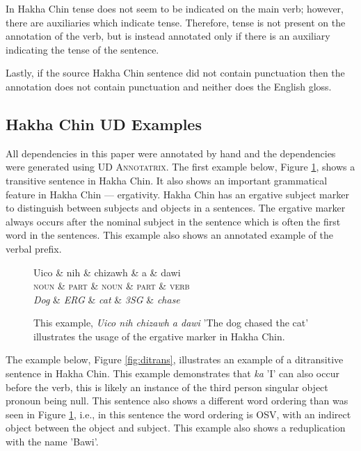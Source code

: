 \documentclass[10pt, a4paper]{article}
\begin{document}
In Hakha Chin tense does not seem to be indicated on the main verb; however, there are auxiliaries which indicate tense. Therefore, tense is not present on the annotation of the verb, but is instead annotated only if there is an auxiliary indicating the tense of the sentence.

Lastly, if the source Hakha Chin sentence did not contain punctuation then the annotation does not contain punctuation and neither does the English gloss. 

\subsection{Hakha Chin UD Examples}
\label{sec:actualdep}

All dependencies in this paper were annotated by hand and the dependencies were generated using UD \textsc{Annotatrix}. The first example below, Figure \ref{fig:erg}, shows a transitive sentence in Hakha Chin. It also shows an important grammatical feature in Hakha Chin --- ergativity. Hakha Chin has an ergative subject marker to distinguish between subjects and objects in a sentences. The ergative marker always occurs after the nominal subject in the sentence which is often the first word in the sentences. This example also shows an annotated example of the verbal prefix. 

\begin{figure}[h]
\centering
 \begin{dependency} 
   \begin{deptext}[column sep=0.2cm]
     Uico \& nih \& chizawh \& a \& dawi\\
     \textsc{noun} \& \textsc{part} \& \textsc{noun} \& \textsc{part} \& \textsc{verb}\\
     \emph{Dog} \& \emph{ERG} \& \emph{cat} \& \emph{3SG} \& 		\emph{chase} \\
     \end{deptext}
 \end{dependency}
\caption{\label{fig:erg}}This example, \emph{Uico nih chizawh a dawi} 'The dog chased the cat' illustrates the usage of the ergative marker in Hakha Chin.
\end{figure}

The example below, Figure \ref{fig:ditrans}, illustrates an example of a ditransitive sentence in Hakha Chin. This example demonstrates that \emph{ka} 'I' can also occur before the verb, this is likely an instance of the third person singular object pronoun being null. This sentence also shows a different word ordering than was seen in Figure \ref{fig:erg}, i.e., in this sentence the word ordering is OSV, with an indirect object between the object and subject. This example also shows a reduplication with the name 'Bawi'. 
\end{document}
